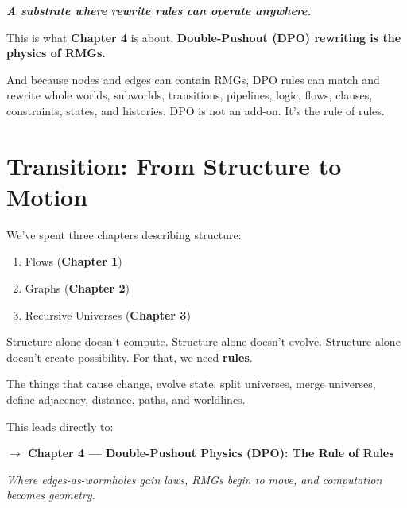 \textbf{\textit{A substrate where rewrite rules can operate anywhere.}}

This is what \textbf{Chapter 4} is about. \textbf{Double-Pushout (DPO) rewriting is the physics of RMGs.}

And because nodes and edges can contain RMGs, DPO rules can match and rewrite whole worlds, subworlds, transitions, pipelines, logic, flows, clauses, constraints, states, and histories. DPO is not an add-on. It's the rule of rules.

\section*{Transition: From Structure to Motion}

We've spent three chapters describing structure:
\begin{enumerate}
    \item Flows (\textbf{Chapter 1})
    \item Graphs (\textbf{Chapter 2})
    \item Recursive Universes (\textbf{Chapter 3})
\end{enumerate}

Structure alone doesn't compute. Structure alone doesn't evolve. Structure alone doesn't create possibility. For that, we need \textbf{rules}.

The things that cause change, evolve state, split universes, merge universes, define adjacency, distance, paths, and worldlines.

This leads directly to:

\textbf{$\rightarrow$ Chapter 4 — Double-Pushout Physics (DPO): The Rule of Rules}

\textit{Where edges-as-wormholes gain laws, RMGs begin to move, and computation becomes geometry.}